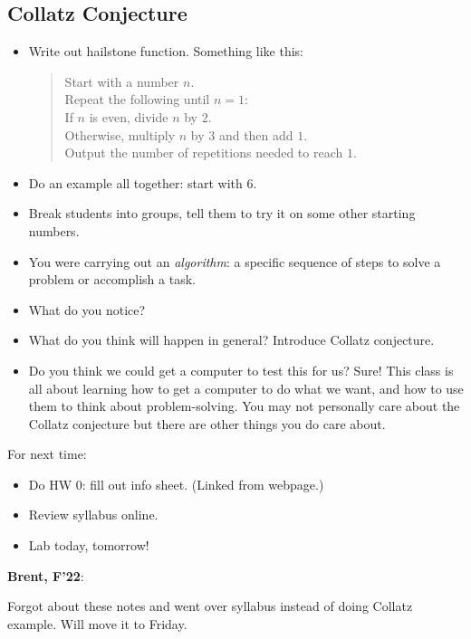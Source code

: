 \documentclass{article}
\newenvironment{reflect}[1]
{
  \noindent
  \begin{lrbox}{\reflectbox}
    \begin{minipage}[t]{\textwidth}
      \textbf{#1}:
}{
    \end{minipage}
  \end{lrbox}
  \fbox{\usebox{\reflectbox}}
}
\begin{document}
\subsection*{Collatz Conjecture}

\begin{itemize}
\item Write out hailstone function. Something like this:
  \begin{quote}
    Start with a number $n$. \\
    Repeat the following until $n = 1$: \\
    \mbox{} \quad If $n$ is even, divide $n$ by $2$. \\
    \mbox{} \quad Otherwise, multiply $n$ by $3$ and then add $1$. \\
    Output the number of repetitions needed to reach $1$.
  \end{quote}
\item Do an example all together: start with 6.
\item Break students into groups, tell them to try it on some other
  starting numbers.
\item You were carrying out an \emph{algorithm}: a specific sequence
  of steps to solve a problem or accomplish a task.
\item What do you notice?
\item What do you think will happen in general?  Introduce Collatz
  conjecture.
\item Do you think we could get a computer to test this for us?  Sure!
  This class is all about learning how to get a computer to do what we
  want, and how to use them to think about problem-solving.  You may
  not personally care about the Collatz conjecture but there are other
  things you do care about.
\end{itemize}


For next time:

\begin{itemize}
\item Do HW 0: fill out info sheet.  (Linked from webpage.)
\item Review syllabus online.
\item Lab today, tomorrow!
\end{itemize}

\begin{reflect}{Brent, F'22}
  Forgot about these notes and went over syllabus instead of doing
  Collatz example.  Will move it to Friday.
\end{reflect}
\end{document}
